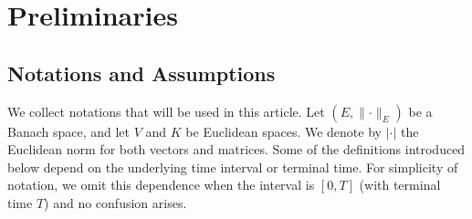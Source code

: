 \documentclass[11pt,reqno]{amsart}
\numberwithin{equation}{section}
\begin{document}
\section{Preliminaries}

\subsection{Notations and Assumptions}\label{sec:notations}

We collect notations that  will be used in this article. Let $(E,\|\bm\cdot\|_{E})$ be a Banach space, and let $V$ and $K$ be Euclidean spaces. We denote by $|\bm\cdot|$ the Euclidean norm  for both vectors and matrices. Some of the definitions introduced below depend on the underlying time interval or terminal time. For simplicity of notation, we omit this dependence when the interval is $[0,T]$ (with terminal time $T$) and no confusion arises.
\end{document}
